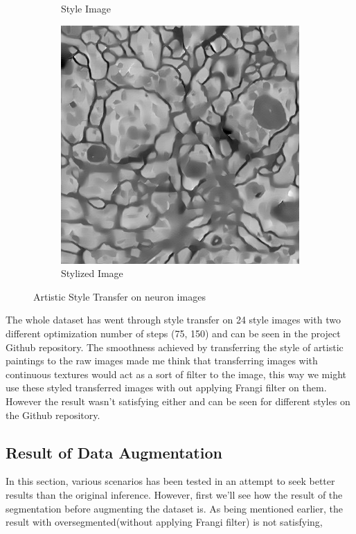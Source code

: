 \documentclass[12pt, a4paper]{scrartcl}
\begin{document}
\begin{figure}[H]
\begin{subfigure}{.28\textwidth}
  \caption{Style Image}
  \label{fig:nas212}
\end{subfigure}
\begin{subfigure}{.34\textwidth}
  \centering
  \includegraphics[width=.9\linewidth]{stylized-train0-style21-150}
  \caption{Stylized Image}
  \label{fig:nas213}
\end{subfigure}
\label{fig:neuron_art_style21}
\caption{Artistic Style Transfer on neuron images}
\end{figure}

The whole dataset has went through style transfer on 24 style images \citep{21styles} with two different optimization number of steps (75, 150) and can be seen in the project Github repository. The smoothness achieved by transferring the style of artistic paintings to the raw images made me think that transferring images with continuous textures would act as a sort of filter to the image, this way we might use these styled transferred images with out applying Frangi filter on them. However the result wasn't satisfying either and can be seen for different styles \citep{textureStyles} on the Github repository. 

\subsection{Result of Data Augmentation}

In this section, various scenarios has been tested in an attempt to seek better results than the original inference. However, first we'll see how the result of the segmentation before augmenting the dataset is. As being mentioned earlier, the result with oversegmented(without applying Frangi filter) is not satisfying, 
\end{document}
